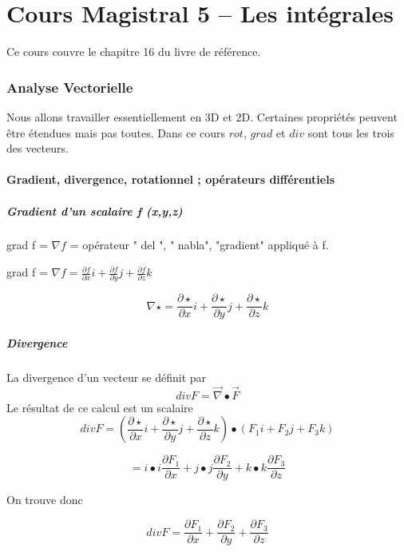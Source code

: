 \part{Cours Magistral 5 -- Les intégrales}
Ce cours couvre le chapitre 16 du livre de référence.

\section{Analyse Vectorielle}


Nous allons travailler essentiellement en 3D et 2D. Certaines propriétés peuvent être étendues mais pas toutes. Dans ce cours $rot$, $grad$ et $div$ sont tous les trois des vecteurs.

\subsection{Gradient, divergence, rotationnel ; opérateurs différentiels}
\subsubsection{Gradient d'un scalaire f (x,y,z)}

grad f = $\nabla f$ = opérateur " del ", " nabla", "gradient" appliqué à f.

grad f = $\nabla f =\frac{\partial f}{\partial x} i +\frac{\partial f}{\partial y} j +\frac{\partial f}{\partial z} k$

\[\nabla \star = \frac{\partial \star}{\partial x} i +\frac{\partial \star}{\partial y} j +\frac{\partial \star}{\partial z} k\]
\subsubsection{Divergence}
\begin{mydef}
La divergence d'un vecteur se définit par
\[div F = \vec \nabla \bullet \vec F\]
Le résultat de ce calcul est un scalaire
\[div F = \left( \frac{\partial \star}{\partial x} i +\frac{\partial \star}{\partial y} j +\frac{\partial \star}{\partial z} k \right) \bullet (F_1 i +F_2 j +F_3 k) \]

\[= i\bullet i \frac{\partial F_1}{\partial x}+j\bullet j \frac{\partial F_2}{\partial y}+k\bullet k \frac{\partial F_3}{\partial z}  \]

On trouve donc

\[div F = \frac{\partial F_1}{\partial x}+\frac{\partial F_2}{\partial y}+\frac{\partial F_3}{\partial z}\]
\end{mydef}

